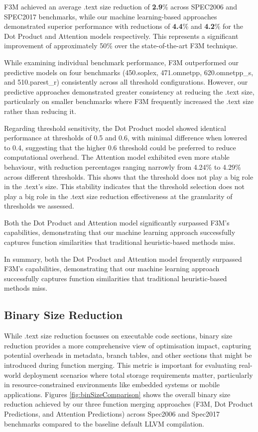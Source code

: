 F3M achieved an average .text size reduction of \textbf{2.9}\% across SPEC2006 and SPEC2017 benchmarks, while our machine learning-based approaches demonstrated superior performance with reductions of \textbf{4.4}\% and \textbf{4.2}\% for the Dot Product and Attention models respectively. This represents a significant improvement of approximately 50\% over the state-of-the-art F3M technique.

While examining individual benchmark performance, F3M outperformed our predictive models on four benchmarks (450.soplex, 471.omnetpp, 620.omnetpp\_s, and 510.parest\_r) consistently across all threshold configurations. However, our predictive approaches demonstrated greater consistency at reducing the .text size, particularly on smaller benchmarks where F3M frequently increased the .text size rather than reducing it.

Regarding threshold sensitivity, the Dot Product model showed identical performance at thresholds of 0.5 and 0.6, with minimal difference when lowered to 0.4, suggesting that the higher 0.6 threshold could be preferred to reduce computational overhead. The Attention model exhibited even more stable behaviour, with reduction percentages ranging narrowly from 4.24\% to 4.29\% across different thresholds. This shows that the threshold does not play a big role in the .text's size. This stability indicates that the threshold selection does not play a big role in the .text size reduction effectiveness at the granularity of thresholds we assessed.

Both the Dot Product and Attention model significantly surpassed F3M's capabilities, demonstrating that our machine learning approach successfully captures function similarities that traditional heuristic-based methods miss.

In summary, both the Dot Product and Attention model frequently surpassed F3M's capabilities, demonstrating that our machine learning approach successfully captures function similarities that traditional heuristic-based methods miss.

\subsection{Binary Size Reduction}
While .text size reduction focusses on executable code sections, binary size reduction provides a more comprehensive view of optimisation impact, capturing potential overheads in metadata, branch tables, and other sections that might be introduced during function merging. This metric is important for evaluating real-world deployment scenarios where total storage requirements matter, particularly in resource-constrained environments like embedded systems or mobile applications. Figures \ref{fig:binSizeComparison} shows the overall binary size reduction achieved by our three function merging approaches (F3M, Dot Product Predictions, and Attention Predictions) across Spec2006 and Spec2017 benchmarks compared to the baseline default LLVM compilation. 

